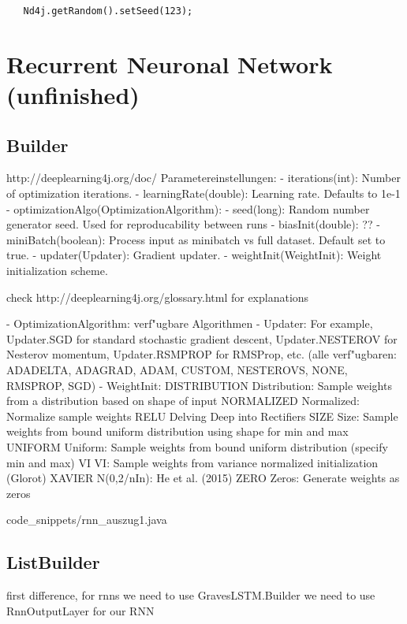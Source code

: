 {\begin{lstlisting}
   Nd4j.getRandom().setSeed(123);
\end{lstlisting}

\section{Recurrent Neuronal Network (unfinished)}
\subsection{Builder}
http://deeplearning4j.org/doc/
Parametereinstellungen:
- iterations(int): Number of optimization iterations.
- learningRate(double): Learning rate. Defaults to 1e-1
- optimizationAlgo(OptimizationAlgorithm):  
- seed(long): Random number generator seed. Used for reproducability between runs
- biasInit(double): ??
- miniBatch(boolean): Process input as minibatch vs full dataset. Default set to true.
- updater(Updater): Gradient updater. 
- weightInit(WeightInit): Weight initialization scheme.

check http://deeplearning4j.org/glossary.html for explanations

- OptimizationAlgorithm: verf"ugbare Algorithmen %
- Updater: For example, Updater.SGD for standard stochastic gradient descent, Updater.NESTEROV for Nesterov momentum, Updater.RSMPROP for RMSProp, etc. (alle verf"ugbaren: ADADELTA, ADAGRAD, ADAM, CUSTOM, NESTEROVS, NONE, RMSPROP, SGD)
- WeightInit:
DISTRIBUTION Distribution: Sample weights from a distribution based on shape of input
NORMALIZED Normalized: Normalize sample weights
RELU Delving Deep into Rectifiers
SIZE Size: Sample weights from bound uniform distribution using shape for min and max
UNIFORM Uniform: Sample weights from bound uniform distribution (specify min and max)
VI VI: Sample weights from variance normalized initialization (Glorot)
XAVIER N(0,2/nIn): He et al. (2015)
ZERO Zeros: Generate weights as zeros


{code_snippets/rnn_auszug1.java}

\subsection{ListBuilder}
first difference, for rnns we need to use GravesLSTM.Builder
we need to use RnnOutputLayer for our RNN

}
